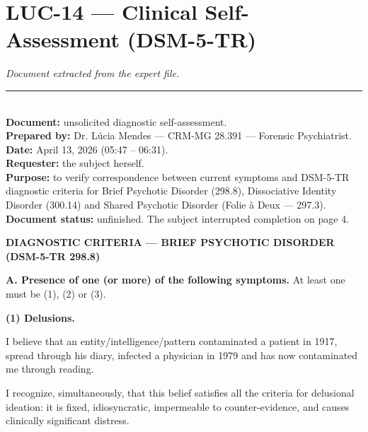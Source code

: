 \section*{\textbf{LUC-14} --- Clinical Self-Assessment (DSM-5-TR)}

\noindent \textit{Document extracted from the expert file.}

\vspace{0.5em}\noindent\rule{\textwidth}{0.5pt}\vspace{0.5em}


\\[-0.2em]

\noindent\textbf{Document:} unsolicited diagnostic self-assessment.\\
\noindent \textbf{Prepared by:} Dr. Lúcia Mendes --- CRM-MG 28.391 --- Forensic Psychiatrist.\\
\noindent\textbf{Date:} April 13, 2026 (05:47 -- 06:31).\\
\noindent \textbf{Requester:} the subject herself.\\
\noindent \textbf{Purpose:} to verify correspondence between current symptoms and
\noindent DSM-5-TR diagnostic criteria for Brief Psychotic Disorder (298.8),
\noindent Dissociative Identity Disorder (300.14) and Shared Psychotic
\noindent Disorder (Folie à Deux --- 297.3).\\
\noindent \textbf{Document status:} unfinished. The subject interrupted
\noindent completion on page 4.

\noindent \textbf{DIAGNOSTIC CRITERIA --- BRIEF PSYCHOTIC DISORDER (DSM-5-TR 298.8)}

\textbf{A. Presence of one (or more) of the following symptoms.}
\noindent At least one must be (1), (2) or (3).

\noindent \textbf{(1) Delusions.}

\noindent I believe that an entity\slash intelligence\slash pattern
\noindent contaminated a patient in 1917, spread through his diary,
\noindent infected a physician in 1979 and has now contaminated me through reading.

\noindent I recognize, simultaneously, that this belief satisfies
\noindent all the criteria for delusional ideation: it is fixed, idiosyncratic,
\noindent impermeable to counter-evidence, and causes clinically significant distress.

